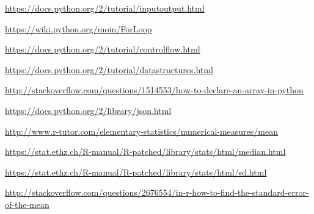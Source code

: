 \label{reference}
%
%

%
% 
% 
%
\begin{thebibliography}{99.}
%
%
%




\bibitem \hyperref[io]{https://docs.python.org/2/tutorial/inputoutput.html}

\bibitem \hyperref[for]{https://wiki.python.org/moin/ForLoop}

\bibitem \hyperref[if]{https://docs.python.org/2/tutorial/controlflow.html}

\bibitem \hyperref[ds]{https://docs.python.org/2/tutorial/datastructures.html}

\bibitem \hyperref[array]{http://stackoverflow.com/questions/1514553/how-to-declare-an-array-in-python}

\bibitem \hyperref[json]{https://docs.python.org/2/library/json.html}

\bibitem \hyperref[mean]{http://www.r-tutor.com/elementary-statistics/numerical-measures/mean}

\bibitem \hyperref[median]{https://stat.ethz.ch/R-manual/R-patched/library/stats/html/median.html}

\bibitem \hyperref[sd]{https://stat.ethz.ch/R-manual/R-patched/library/stats/html/sd.html}

\bibitem \hyperref[se]{http://stackoverflow.com/questions/2676554/in-r-how-to-find-the-standard-error-of-the-mean} 

\end{thebibliography}